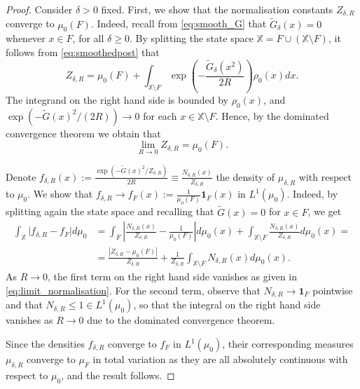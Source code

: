 \documentclass[10pt,a4paper]{amsart}
\begin{document}
\begin{proof}

Consider $\delta>0$ fixed. First, we show that the normalisation constants $Z_{\delta,R}$ converge to $\mu_0(F)$. Indeed, recall from \eqref{eq:smooth_G} that $\tilde{G}_\delta(x)=0$ whenever $x\in F$, for all $\delta\geq 0$. By splitting the state space $\mathbb{X}=F \cup (\mathbb X \setminus F)$, it follows from \eqref{eq:smoothedpost} that
\[
    Z_{\delta,R} = \mu_0(F) + \int_{\mathbb X \setminus F} \exp\left( -\frac{\tilde{G}_\delta(x^2)}{2R} \right) \rho_0(x)dx.
\]
The integrand on the right hand side is bounded by $\rho_0(x)$, and $\exp(-\tilde{G}(x)^2/(2R))\rightarrow 0$ for each $x\in \mathbb{X}\setminus F$. Hence, by the dominated convergence theorem we obtain that
\begin{equation}
    \label{eq:limit_normalisation}
        \lim_{R\rightarrow 0} Z_{\delta,R}=\mu_0(F).
\end{equation}

Denote $f_{\delta,R}(x):=\frac{\exp\left(- \tilde{G}(x)^2/Z_{\delta,R}\right)}{2R}\equiv \frac{N_{\delta,R}(x)}{Z_{\delta,R}}$ the density of $\mu_{\delta,R}$ with respect to $\mu_0$. We show that $f_{\delta,R}\rightarrow f_F(x):= \frac{1}{\mu_0(F)}\mathbf{1}_F(x)$ in $L^1(\mu_0)$. Indeed, by splitting again the state space and recalling that $\tilde G(x)=0$ for $x\in F$, we get
\begin{align*}
    \int_{\mathbb X}\vert f_{\delta,R}-f_F \vert d\mu_0 & = \int_F \left\vert \frac{N_{\delta,R}(x)}{Z_{\delta,R}} - \frac{1}{\mu_0(F)}\right\vert d\mu_0(x) + \int_{\mathbb X \setminus F} \frac{N_{\delta, R}(x)}{Z_{\delta,R}}d\mu_0(x)= \\
    &= \frac{\left\vert Z_{\delta,R}-\mu_0(F) \right\vert}{Z_{\delta,R}}+ \frac{1}{Z_{\delta,R}}\int_{\mathbb{X}\setminus F}N_{\delta,R}(x)d\mu_0(x).
\end{align*}
As $R\rightarrow 0$, the first term on the right hand side vanishes as given in \eqref{eq:limit_normalisation}. For the second term, observe that $N_{\delta,R}\rightarrow \mathbf{1}_F$ pointwise and that $N_{\delta,R}\leq 1 \in L^1(\mu_0)$, so that the integral on the right hand side vanishes as $R\rightarrow 0$ due to the dominated convergence theorem. 

Since the densities $f_{\delta,R}$ converge to $f_F$ in $L^1(\mu_0)$, their corresponding measures $\mu_{\delta,R}$ converge to $\mu_F$ in total variation as they are all absolutely continuous with respect to $\mu_0$, and the result follows.
\end{proof}
\end{document}
